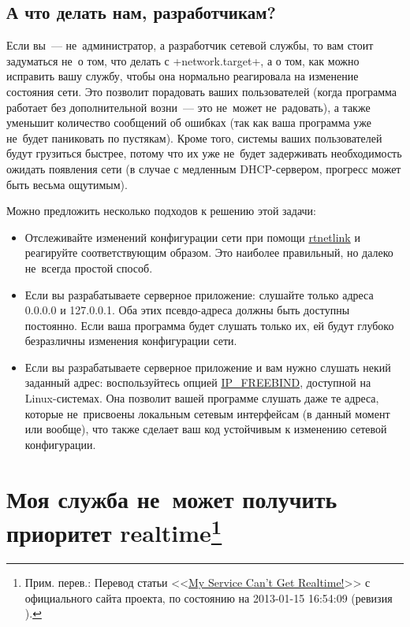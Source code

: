 \documentclass[10pt,oneside,a4paper]{article}
\newcommand{\sfnote}[1]{\texorpdfstring{\protect\footnote%
	{Прим. перев.: #1}}{}}
\begin{document}
\subsection*{А что делать нам, разработчикам?}

Если вы~--- не~администратор, а разработчик сетевой службы, то вам стоит
задуматься не~о том, что делать с +network.target+, а о том, как можно исправить
вашу службу, чтобы она нормально реагировала на изменение состояния сети. Это
позволит порадовать ваших пользователей (когда программа работает без
дополнительной возни~--- это не~может не~радовать), а также уменьшит количество
сообщений об ошибках (так как ваша программа уже не~будет паниковать по
пустякам). Кроме того, системы ваших пользователей будут грузиться быстрее,
потому что их уже не~будет задерживать необходимость ожидать появления сети (в
случае с медленным DHCP-сервером, прогресс может быть весьма ощутимым).

Можно предложить несколько подходов к решению этой задачи:
\begin{itemize}
	\item Отслеживайте изменений конфигурации сети при помощи
		\href{https://www.kernel.org/doc/man-pages/online/pages/man7/rtnetlink.7.html}%
		{rtnetlink} и реагируйте соответствующим образом. Это наиболее
		правильный, но далеко не~всегда простой способ.
	\item Если вы разрабатываете серверное приложение: слушайте только
		адреса 0.0.0.0 и 127.0.0.1. Оба этих псевдо-адреса должны быть
		доступны постоянно. Если ваша программа будет слушать только их,
		ей будут глубоко безразличны изменения конфигурации сети.
	\item Если вы разрабатываете серверное приложение и вам нужно слушать
		некий заданный адрес: воспользуйтесь опцией
		\href{https://www.kernel.org/doc/man-pages/online/pages/man7/ip.7.html}%
		{IP\_FREEBIND}, доступной на Linux-системах. Она позволит вашей
		программе слушать даже те адреса, которые не~присвоены локальным
		сетевым интерфейсам (в данный момент или вообще), что также
		сделает ваш код устойчивым к изменению сетевой конфигурации.
\end{itemize}

\section{Моя служба не~может получить приоритет realtime\sfnote{Перевод статьи
<<\href{http://www.freedesktop.org/wiki/Software/systemd/MyServiceCantGetRealtime}%
{My Service Can't Get Realtime!}>> с официального сайта проекта, по состоянию на
2013-01-15 16:54:09 (ревизия \No1).}}
\end{document}
